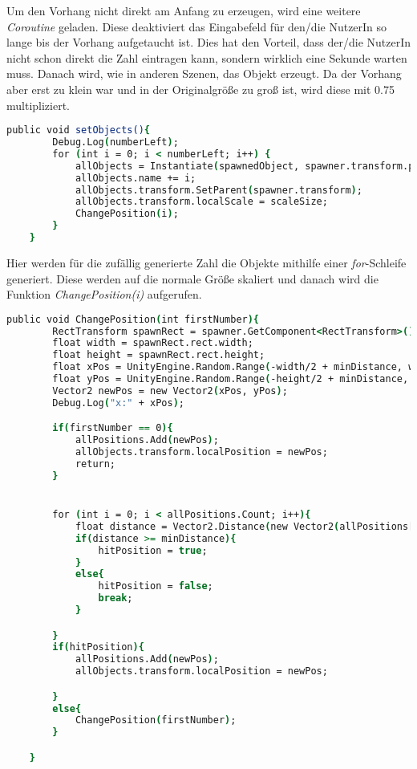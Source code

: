 Um den Vorhang nicht direkt am Anfang zu erzeugen, wird eine weitere \textit{Coroutine} geladen. Diese deaktiviert das Eingabefeld für den/die NutzerIn so lange bis der Vorhang aufgetaucht ist. Dies hat den Vorteil, dass der/die NutzerIn nicht schon direkt die Zahl eintragen kann, sondern wirklich eine Sekunde warten muss. Danach wird, wie in anderen Szenen, das Objekt erzeugt. Da der Vorhang aber erst zu klein war und in der Originalgröße zu groß ist, wird diese mit 0.75 multipliziert.\\
\begin{lstlisting}[language=csh, caption={hideCircle.cs setObjects-Funktion}]
	public void setObjects(){
		Debug.Log(numberLeft);
		for (int i = 0; i < numberLeft; i++) {
			allObjects = Instantiate(spawnedObject, spawner.transform.position, Quaternion.identity);
			allObjects.name += i;
			allObjects.transform.SetParent(spawner.transform);
			allObjects.transform.localScale = scaleSize;
			ChangePosition(i);
		}
	}
\end{lstlisting}
Hier werden für die zufällig generierte Zahl die Objekte mithilfe einer \textit{for}-Schleife generiert. Diese werden auf die normale Größe skaliert und danach wird die Funktion \textit{ChangePosition(i)} aufgerufen.\\
\begin{lstlisting}[language=csh, caption={hideCircle.cs ChangePosition-Funktion}]
	public void ChangePosition(int firstNumber){
		RectTransform spawnRect = spawner.GetComponent<RectTransform>();
		float width = spawnRect.rect.width;
		float height = spawnRect.rect.height;
		float xPos = UnityEngine.Random.Range(-width/2 + minDistance, width/2 - minDistance);
		float yPos = UnityEngine.Random.Range(-height/2 + minDistance, height/2 - minDistance);
		Vector2 newPos = new Vector2(xPos, yPos);
		Debug.Log("x:" + xPos);

		if(firstNumber == 0){
			allPositions.Add(newPos);
			allObjects.transform.localPosition = newPos;
			return;
		}


		for (int i = 0; i < allPositions.Count; i++){
			float distance = Vector2.Distance(new Vector2(allPositions[i].x, allPositions[i].y), new Vector2(newPos.x, newPos.y));
			if(distance >= minDistance){
				hitPosition = true;
			}
			else{
				hitPosition = false;
				break;
			}

		}
		if(hitPosition){
			allPositions.Add(newPos);
			allObjects.transform.localPosition = newPos;

		}
		else{
			ChangePosition(firstNumber);
		}

	}
\end{lstlisting}
